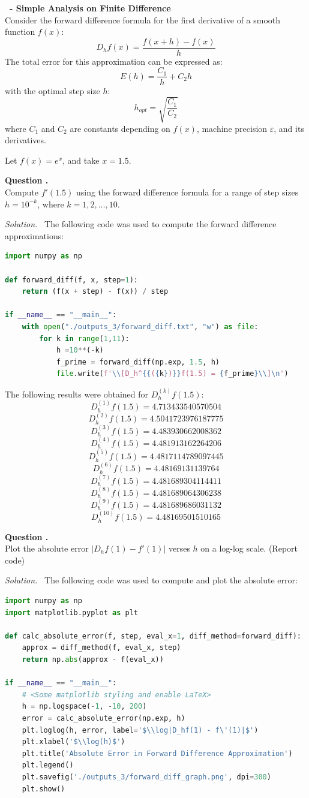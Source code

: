 \documentclass[12pt]{article}
\newcounter{question}
\newcounter{subquest}
\newcommand{\question}[1]{
    \stepcounter{question} 
    \vspace{1em}
    \textbf{\Large\thequestion \ - #1}
    \vspace{.5em} 
    \setcounter{subquest}{0}\ \\}
\newcommand{\subquestion}{
    \stepcounter{subquest} 
    \vspace{.5em}
    \textbf{\large Question \thequestion.\thesubquest}
    \vspace{.25em}\ \\}
\newcommand{\solution}
    {\par\vspace{0.5em}\noindent\emph{Solution.}\ }
    {\par\vspace{1em}}
\begin{document}
\newpage

\question{Simple Analysis on Finite Difference}
Consider the forward difference formula for the first derivative of a smooth function $f(x)$:
\[D_hf(x) = \frac{f(x+h)-f(x)}{h}\]
The total error for this approximation can be expressed as:
\[E(h)=\frac{C_1}{h}+C_2h\]
with the optimal step size $h$:
\[h_{opt}=\sqrt{\frac{C_1}{C_2}}\]
where $C_1$ and $C_2$ are constants depending on $f(x)$, machine precision $\varepsilon$, and its derivatives.

Let $f(x) = e^x$, and take $x=1.5$.

\subquestion
Compute $f'(1.5)$ using the forward difference formula 
for a range of step sizes $h=10^{-k}$, where $k=1,2,
\ldots, 10$.

\solution
The following code was used to compute the forward difference approximations:

\begin{lstlisting}[language=Python, caption=2.1 Python]
import numpy as np

def forward_diff(f, x, step=1):
    return (f(x + step) - f(x)) / step

if __name__ == "__main__":
    with open("./outputs_3/forward_diff.txt", "w") as file:
        for k in range(1,11):
            h =10**(-k)
            f_prime = forward_diff(np.exp, 1.5, h)
            file.write(f'\\[D_h^{{({k})}}f(1.5) = {f_prime}\\]\n')
\end{lstlisting}

The following results were obtained for $D_h^{(k)}f(1.5)$:
\[D_h^{(1)}f(1.5) = 4.713433540570504\]
\[D_h^{(2)}f(1.5) = 4.5041723976187775\]
\[D_h^{(3)}f(1.5) = 4.483930662008362\]
\[D_h^{(4)}f(1.5) = 4.481913162264206\]
\[D_h^{(5)}f(1.5) = 4.4817114789097445\]
\[D_h^{(6)}f(1.5) = 4.48169131139764\]
\[D_h^{(7)}f(1.5) = 4.481689304114411\]
\[D_h^{(8)}f(1.5) = 4.481689064306238\]
\[D_h^{(9)}f(1.5) = 4.481689686031132\]
\[D_h^{(10)}f(1.5) = 4.48169501510165\]

\subquestion
Plot the absolute error $|D_hf(1)-f'(1)|$ verses $h$ 
on a log-log scale. (Report code)

\solution
The following code was used to compute and plot the absolute error:
\begin{lstlisting}[language=Python, caption=2.2 Python]
import numpy as np
import matplotlib.pyplot as plt

def calc_absolute_error(f, step, eval_x=1, diff_method=forward_diff):
    approx = diff_method(f, eval_x, step)
    return np.abs(approx - f(eval_x))

if __name__ == "__main__":
    # <Some matplotlib styling and enable LaTeX>
    h = np.logspace(-1, -10, 200)
    error = calc_absolute_error(np.exp, h)
    plt.loglog(h, error, label='$\\log|D_hf(1) - f\'(1)|$')
    plt.xlabel('$\\log(h)$')
    plt.title('Absolute Error in Forward Difference Approximation')
    plt.legend()
    plt.savefig('./outputs_3/forward_diff_graph.png', dpi=300)
    plt.show()
\end{lstlisting}
\end{document}

